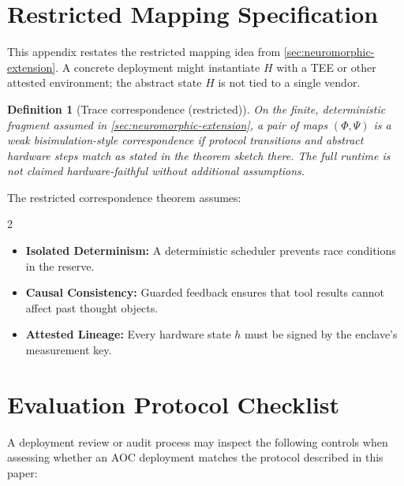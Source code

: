 \documentclass[11pt]{article}
\newtheorem{definition}{Definition}[section]
\theoremstyle{remark}
\newcommand{\AOC}{\textup{\textsc{AOC}}}
\begin{document}
\section[Restricted Mapping]{Restricted Mapping Specification}

This appendix restates the restricted mapping idea from \cref{sec:neuromorphic-extension}. A concrete deployment might instantiate $H$ with a TEE or other attested environment; the abstract state $H$ is not tied to a single vendor.

\begin{definition}[Trace correspondence (restricted)]
On the finite, deterministic fragment assumed in \cref{sec:neuromorphic-extension}, a pair of maps $(\Phi,\Psi)$ is a weak bisimulation-style correspondence if protocol transitions and abstract hardware steps match as stated in the theorem sketch there. The full runtime is not claimed hardware-faithful without additional assumptions.
\end{definition}

The restricted correspondence theorem assumes:
\begin{multicols*}{2}
\raggedcolumns
\begin{itemize}[leftmargin=1.5em]
\item \textbf{Isolated Determinism:} A deterministic scheduler prevents race conditions in the reserve.
\item \textbf{Causal Consistency:} Guarded feedback ensures that tool results cannot affect past thought objects.
\item \textbf{Attested Lineage:} Every hardware state $h$ must be signed by the enclave's measurement key.
\end{itemize}
\end{multicols*}

\section[Evaluation Checklist]{Evaluation Protocol Checklist}

A deployment review or audit process may inspect the following controls when assessing whether an \AOC{} deployment matches the protocol described in this paper:
\end{document}
